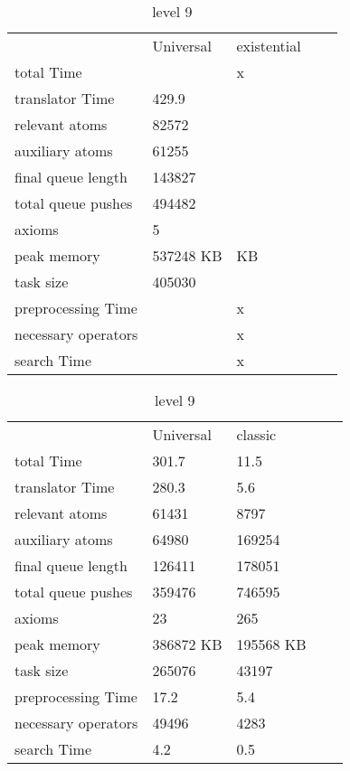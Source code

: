 			\begin{table}[h]
				\centering
				\caption{level 9}
				\label{lvl9}
				\begin{tabular}{lllll}
					& Universal & existential  \\
					total Time&  & x \\
					translator Time& 429.9 & \\
					
					
					relevant atoms & 82572 & \\
					auxiliary atoms & 61255 & \\
					final queue length & 143827 & \\
					total queue pushes & 494482 & \\
					axioms & 5 &  \\ 
					peak memory & 537248 KB &  KB\\ 
					task size & 405030 & \\
					
					
					preprocessing Time& & x \\
					necessary operators & & x \\
					
					
					search Time &  & x \\
				\end{tabular}
			\end{table}
						\begin{table}[h]
							\centering
							\caption{level 9}
							\label{lvl9}
							\begin{tabular}{lllll}
								& Universal & classic  \\
								total Time& 301.7 & 11.5 \\
								translator Time& 280.3 & 5.6\\
								
								
								relevant atoms & 61431 & 8797\\
								auxiliary atoms & 64980 & 169254 \\
								final queue length & 126411 & 178051\\
								total queue pushes & 359476 & 746595\\
								axioms & 23 &  265\\ 
								peak memory & 386872 KB & 195568 KB\\ 
								task size & 265076 & 43197\\
								
								
								preprocessing Time& 17.2 & 5.4 \\
								necessary operators & 49496 & 4283 \\
								
								
								search Time & 4.2 & 0.5 \\
							\end{tabular}
						\end{table}
			
